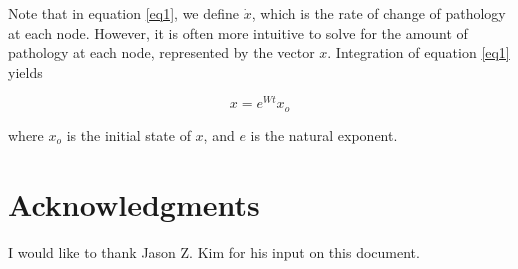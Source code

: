 \documentclass{article}
\begin{document}
Note that in equation \ref{eq1}, we define $\dot{x}$, which is the rate of change of pathology at each node. However, it is often more intuitive to solve for the amount of pathology at each node, represented by the vector $x$. Integration of equation \ref{eq1} yields

\begin{equation}
x=e^{Wt}x_o
\end{equation}

where $x_o$ is the initial state of $x$, and $e$ is the natural exponent.
\section*{Acknowledgments}

I would like to thank Jason Z. Kim for his input on this document.



\end{document}
